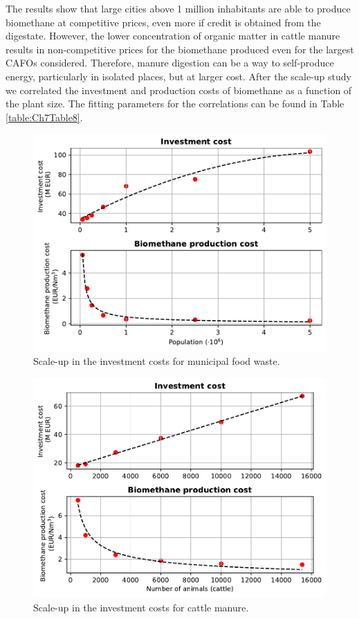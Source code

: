 \begin{refsection}[referencesCh7]
The results show that large cities above 1 million inhabitants are able to produce biomethane at competitive prices, even more if credit is obtained from the digestate. However, the lower concentration of organic matter in cattle manure results in non-competitive prices for the biomethane produced even for the largest CAFOs considered. Therefore, manure digestion can be a way to self-produce energy, particularly in isolated places, but at larger cost. After the scale-up study we correlated the investment and production costs of biomethane as a function of the plant size. The fitting parameters for the correlations can be found in Table \ref{table:Ch7Table8}.

\begin{figure}[h]
	\centering
	\includegraphics[width=0.8\linewidth, trim={0cm 0cm 0cm 0cm},clip]{gfx/Chapter7/Figure5.pdf} 
	\caption{Scale-up in the investment costs for municipal food waste.}
	\label{fig:Ch7Fig5}
\end{figure}

\begin{figure}[h]
	\centering
	\includegraphics[width=0.8\linewidth, trim={0cm 0cm 0cm 0cm},clip]{gfx/Chapter7/Figure6.pdf} 
	\caption{Scale-up in the investment costs for cattle manure.}
	\label{fig:Ch7Fig6}
\end{figure}


\end{refsection}
